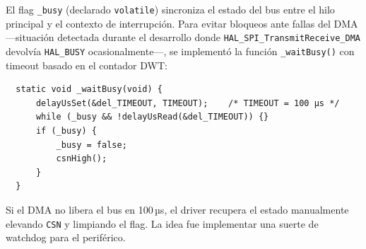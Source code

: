 \documentclass[12pt,a4paper]{article}
\begin{document}
  El flag \texttt{\_busy} (declarado \texttt{volatile}) sincroniza el estado del bus entre el hilo principal y el contexto de interrupción. Para evitar bloqueos ante fallas del DMA —situación detectada durante el desarrollo donde                         
  \texttt{HAL\_SPI\_TransmitReceive\_DMA} devolvía \texttt{HAL\_BUSY} ocasionalmente—, se implementó la función \texttt{\_waitBusy()} con timeout basado en el contador DWT:
                                                                                                                                                                                                                                                              
  \begin{verbatim}
  static void _waitBusy(void) {
      delayUsSet(&del_TIMEOUT, TIMEOUT);    /* TIMEOUT = 100 µs */
      while (_busy && !delayUsRead(&del_TIMEOUT)) {}                                                                                                                                                                                                          
      if (_busy) {                                                                                                                                                                                                                                            
          _busy = false;                                                                                                                                                                                                                                      
          csnHigh();                                                                                                                                                                                                                                          
      }
  }                                                                                                                                                                                                                                                           
  \end{verbatim}
                                                                                                                                                                                                                                                              
  Si el DMA no libera el bus en 100\,µs, el driver recupera el estado manualmente elevando \texttt{CSN} y limpiando el flag.                                                                                                                                  La idea fue implementar una suerte de watchdog para el periférico. 
  
\end{document}
